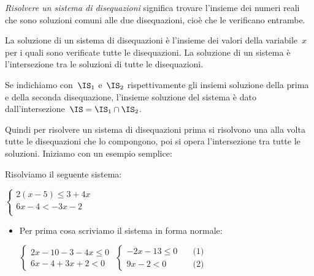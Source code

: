 \begin{exrig}
 \begin{esempio}

\emph{Risolvere un sistema di disequazioni} significa trovare
l'insieme dei numeri reali che sono soluzioni comuni
alle due disequazioni, cioè che le verificano entrambe.

La soluzione di un sistema di disequazioni è l'insieme dei valori della 
variabile~$x$ per i quali sono verificate tutte le disequazioni.
La soluzione di un sistema è l'intersezione tra le soluzioni di tutte le 
disequazioni.

Se indichiamo con~$\IS_{1}$ e~$\IS_{2}$
rispettivamente gli insiemi soluzione della prima e della seconda
disequazione, l'insieme soluzione del sistema è dato
dall'intersezione~$\IS=\IS_{1}\cap\IS_{2}$.

Quindi per risolvere un sistema di disequazioni prima si risolvono una alla 
volta tutte le disequazioni che lo compongono, poi si opera l'intersezione 
tra tutte le soluzioni. Iniziamo con un esempio semplice:

Risolviamo il seguente sistema:

$\left\{\begin{array}{l}
  2 (x -5) \le 3 + 4 x \\
  6 x -4 < -3 x -2 \\
\end{array}\right.$

\begin{itemize}
 \item Per prima cosa scriviamo il sistema in forma normale:
 
$\left\{\begin{array}{l}
  2 x -10 -3 - 4 x \le 0 \\
  6 x -4 +3 x +2 < 0
\end{array}\right.$
$\left\{\begin{array}{ll}
  -2 x -13 \le 0 & \quad \mbox{(1)} \\
   9 x -2 < 0 & \quad \mbox{(2)}
\end{array}\right.$


\end{itemize}
\end{esempio}
\end{exrig}
